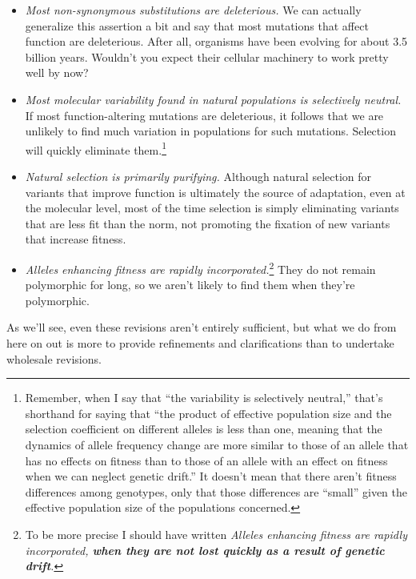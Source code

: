 \documentclass[12pt]{article}
\begin{document}
\begin{itemize}

\item {\it Most non-synonymous substitutions are deleterious.\/} We
  can actually generalize this assertion a bit and say that most
  mutations that affect function are deleterious. After all, organisms
  have been evolving for about 3.5 billion years. Wouldn't you expect
  their cellular machinery to work pretty well by now?

\item {\it Most molecular variability found in natural populations is
    selectively neutral.} If most function-altering mutations are
  deleterious, it follows that we are unlikely to find much variation
  in populations for such mutations. Selection will quickly eliminate
  them.\footnote{Remember, when I say that ``the variability is
    selectively neutral,'' that's shorthand for saying that ``the
    product of effective population size and the selection coefficient
    on different alleles is less than one, meaning that the dynamics
    of allele frequency change are more similar to those of an allele
    that has no effects on fitness than to those of an allele with an
    effect on fitness when we can neglect genetic drift.'' It doesn't
    mean that there aren't fitness differences among genotypes, only
    that those differences are ``small'' given the effective
    population size of the populations concerned.}

\item {\it Natural selection is primarily purifying.} Although natural
  selection for variants that improve function is ultimately the
  source of adaptation, even at the molecular level, most of the time
  selection is simply eliminating variants that are less fit than the
  norm, not promoting the fixation of new variants that increase
  fitness.

\item {\it Alleles enhancing fitness are rapidly
    incorporated.}\footnote{To be more precise I should have written
    {\it Alleles enhancing fitness are rapidly incorporated, {\bf when
        they are not lost quickly as a result of genetic drift}.\/}}
  They do not remain polymorphic for long, so we aren't likely to find
  them when they're polymorphic.

\end{itemize}

As we'll see, even these revisions aren't entirely sufficient, but
what we do from here on out is more to provide refinements and
clarifications than to undertake wholesale revisions.




\ccLicense
\end{document}
